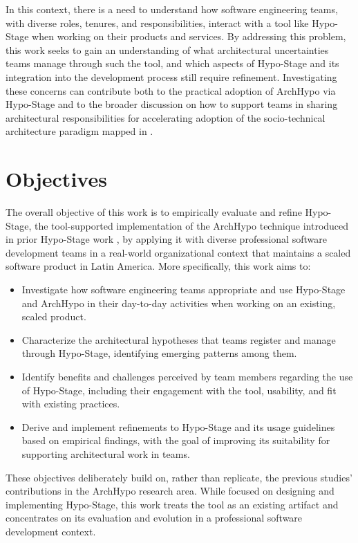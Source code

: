 In this context, there is a need to understand how software engineering teams,
with diverse roles, tenures, and responsibilities, interact with a tool like
Hypo-Stage when working on their products and services. By addressing this problem, this work seeks to gain an understanding of what architectural uncertainties
teams manage through such the tool, and which aspects of Hypo-Stage and its integration into the development process still require refinement.
Investigating these concerns can contribute both to the practical adoption of ArchHypo via Hypo-Stage and to the broader discussion on how to support teams in sharing architectural responsibilities for accelerating adoption of the socio-technical architecture paradigm mapped in \citet{infoq2024trends}.

\section{Objectives}

The overall objective of this work is to empirically evaluate and refine Hypo-Stage, the tool-supported implementation of the ArchHypo technique introduced in prior Hypo-Stage work \citep{correa2025}, by applying it with diverse professional software development teams in a real-world organizational context that maintains a scaled software product in Latin America. 
More specifically, this work aims to:

\begin{itemize}
  \item Investigate how software engineering teams appropriate and use Hypo-Stage and ArchHypo in their day-to-day activities when working on an existing, scaled product.
  \item Characterize the architectural hypotheses that teams register and manage through Hypo-Stage, identifying emerging patterns among them.
  \item Identify benefits and challenges perceived by team members regarding the use of Hypo-Stage, including their engagement with the tool, usability, and fit with existing practices.
  \item Derive and implement refinements to Hypo-Stage and its usage guidelines based on empirical findings, with the goal of improving its suitability for supporting architectural work in teams.
\end{itemize}

These objectives deliberately build on, rather than replicate, the previous studies' contributions in the ArchHypo research area. 
While \citet{correa2025} focused on designing and implementing Hypo-Stage, this work treats the tool as an existing artifact and concentrates on its evaluation and evolution in a professional software development context.

